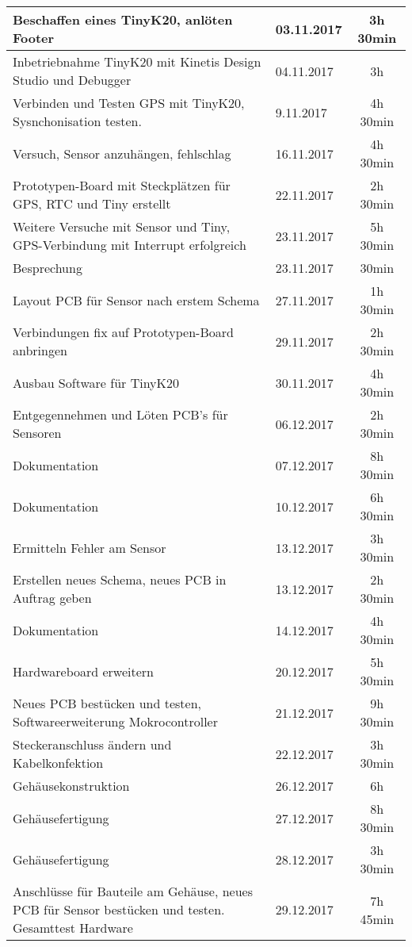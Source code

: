 \begin{longtable}{p{9cm}|p{2cm}|c}
		Beschaffen eines TinyK20, anlöten Footer & 03.11.2017 & 3h 30min \\\midrule
		Inbetriebnahme TinyK20 mit Kinetis Design Studio und Debugger & 04.11.2017 & 3h \\ \midrule
		Verbinden und Testen GPS mit TinyK20, Sysnchonisation testen. & 9.11.2017 & 4h 30min\\\midrule
		Versuch, Sensor anzuhängen, fehlschlag & 16.11.2017 & 4h 30min\\\midrule
		Prototypen-Board mit Steckplätzen für GPS, RTC und Tiny erstellt & 22.11.2017 & 2h 30min \\ \midrule
		Weitere Versuche mit Sensor und Tiny, GPS-Verbindung mit Interrupt erfolgreich & 23.11.2017 & 5h 30min\\ \midrule
		Besprechung & 23.11.2017 & 30min \\ \midrule
		Layout PCB für Sensor nach erstem Schema & 27.11.2017 & 1h 30min \\\midrule
		Verbindungen fix auf Prototypen-Board anbringen & 29.11.2017 & 2h 30min \\\midrule	
		Ausbau Software für TinyK20 & 30.11.2017 & 4h 30min\\\midrule
		Entgegennehmen und Löten PCB's für Sensoren & 06.12.2017 & 2h 30min\\\midrule
		Dokumentation & 07.12.2017 & 8h 30min \\\midrule
		Dokumentation & 10.12.2017 & 6h 30min \\\midrule
		Ermitteln Fehler am Sensor & 13.12.2017 & 3h 30min\\\midrule
		Erstellen neues Schema, neues PCB in Auftrag geben & 13.12.2017 & 2h 30min\\\midrule
		Dokumentation & 14.12.2017 & 4h 30min\\\midrule
		Hardwareboard erweitern & 20.12.2017 & 5h 30min \\ \midrule
		Neues PCB bestücken und testen, Softwareerweiterung Mokrocontroller & 21.12.2017 & 9h 30min  \\ \midrule
		Steckeranschluss ändern und Kabelkonfektion & 22.12.2017 & 3h 30min  \\ \midrule
		Gehäusekonstruktion & 26.12.2017 & 6h  \\ \midrule
		Gehäusefertigung & 27.12.2017 & 8h 30min  \\ \midrule
		Gehäusefertigung & 28.12.2017 & 3h 30min  \\ \midrule
		Anschlüsse für Bauteile am Gehäuse, neues PCB für Sensor bestücken und testen. Gesamttest Hardware & 29.12.2017 & 7h 45min  \\ \midrule

\end{longtable}
